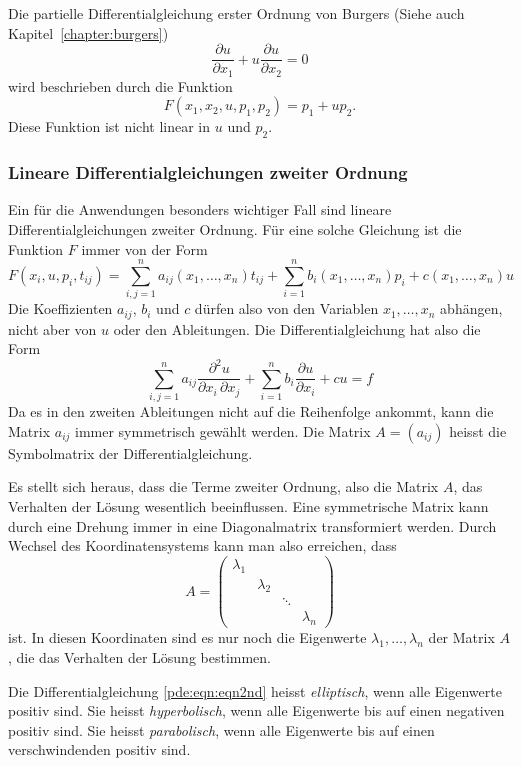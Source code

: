 \begin{beispiel}
Die partielle Differentialgleichung erster Ordnung von Burgers
(Siehe auch Kapitel~\ref{chapter:burgers})
\[
\frac{\partial u}{\partial x_1}
+
u
\frac{\partial u}{\partial x_2}
=
0
\]
wird beschrieben durch die Funktion
\[
F(x_1,x_2,u,p_1,p_2)
=
p_1+up_2.
\]
Diese Funktion ist nicht linear in $u$ und $p_2$.
\end{beispiel}

\subsubsection{Lineare Differentialgleichungen zweiter Ordnung}
Ein für die Anwendungen besonders wichtiger Fall sind lineare
Differentialgleichungen zweiter Ordnung.
Für eine solche Gleichung ist die Funktion $F$ immer von der Form
\[
F(x_i,u,p_i,t_{ij})
=
\sum_{i,j=1}^n a_{ij}(x_1,\dots,x_n)t_{ij} + \sum_{i=1}^n b_i(x_1,\dots,x_n) p_i + c(x_1,\dots,x_n) u 
\]
Die Koeffizienten $a_{ij}$, $b_i$ und $c$ dürfen also von den Variablen
$x_1,\dots,x_n$ abhängen, nicht aber von $u$ oder den Ableitungen.
Die Differentialgleichung hat also die Form
\begin{equation}
\sum_{i,j=1}^n
a_{ij}\frac{\partial^2 u}{\partial x_i\,\partial x_j}
+
\sum_{i=1}^n
b_i\frac{\partial u}{\partial x_i}
+
cu
=
f
\label{pde:eqn:eqn2nd}
\end{equation}
Da es in den zweiten Ableitungen nicht auf die Reihenfolge ankommt,
kann die Matrix $a_{ij}$ immer symmetrisch gewählt werden.
Die Matrix $A=(a_{ij})$ heisst die Symbolmatrix der Differentialgleichung.

Es stellt sich heraus, dass die Terme zweiter Ordnung, also die 
Matrix $A$, das Verhalten der Lösung wesentlich beeinflussen.
Eine symmetrische Matrix kann durch eine Drehung immer in eine
Diagonalmatrix transformiert werden.
Durch Wechsel des Koordinatensystems kann man also erreichen, dass
\[
A
=
\begin{pmatrix}
\lambda_1&         &      &         \\
         &\lambda_2&      &         \\
         &         &\ddots&         \\
         &         &      &\lambda_n
\end{pmatrix}
\]
ist.
In diesen Koordinaten sind es nur noch die Eigenwerte
$\lambda_1,\dots,\lambda_n$ der Matrix $A$, die das Verhalten der Lösung
bestimmen.

\begin{definition}
Die Differentialgleichung
\eqref{pde:eqn:eqn2nd}
heisst {\em elliptisch}, wenn alle Eigenwerte positiv sind.
Sie heisst {\em hyperbolisch}, wenn alle Eigenwerte bis auf einen negativen
positiv sind.
Sie heisst {\em parabolisch}, wenn alle Eigenwerte bis auf einen
verschwindenden positiv sind.
\end{definition}
%
%
%

